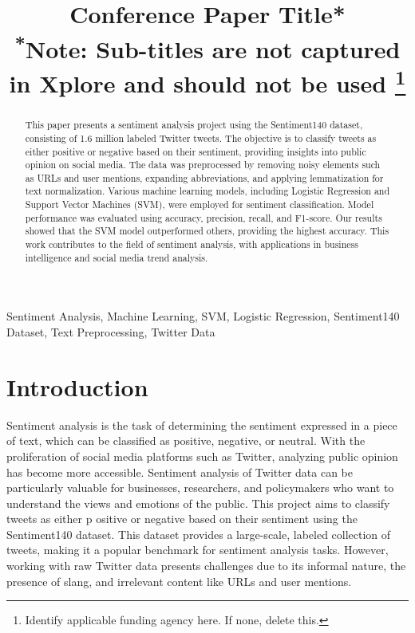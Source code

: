 \documentclass[conference]{IEEEtran}
\begin{document}
\title{Conference Paper Title*\\
{\footnotesize \textsuperscript{*}Note: Sub-titles are not captured in Xplore and
should not be used}
\thanks{Identify applicable funding agency here. If none, delete this.}
}

\author{
}

\maketitle

\begin{abstract}
This paper presents a sentiment analysis project using the Sentiment140 dataset, consisting of 1.6 million labeled Twitter tweets. 
The objective is to classify tweets as either positive or negative based on their sentiment, providing insights into public opinion on social media.
 The data was preprocessed by removing noisy elements such as URLs and user mentions, expanding abbreviations, and applying lemmatization for text normalization. 
 Various machine learning models, including Logistic Regression and Support Vector Machines (SVM), were employed for sentiment classification. Model performance 
 was evaluated using accuracy, precision, recall, and F1-score. Our results showed that the SVM model outperformed others, providing the highest accuracy. This work 
 contributes to the field of sentiment analysis, with applications in business intelligence and social media trend analysis.
\end{abstract}


\begin{IEEEkeywords}
Sentiment Analysis, Machine Learning, SVM, Logistic Regression, Sentiment140 Dataset, Text Preprocessing, Twitter Data
\end{IEEEkeywords}

\section{Introduction}
Sentiment analysis is the task of determining the sentiment expressed in a piece of text, 
which can be classified as positive, negative, or neutral. With the proliferation of social media platforms such as Twitter, 
analyzing public opinion has become more accessible. Sentiment analysis of Twitter data can be particularly valuable for businesses, 
researchers, and policymakers who want to understand the views and emotions of the public. This project aims to classify tweets as either p
ositive or negative based on their sentiment using the Sentiment140 dataset. This dataset provides a large-scale, labeled collection of tweets, 
making it a popular benchmark for sentiment analysis tasks. However, working with raw Twitter data presents challenges due to its informal nature, 
the presence of slang, and irrelevant content like URLs and user mentions.
\end{document}
